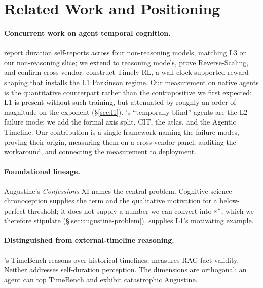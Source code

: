 
\section{Related Work and Positioning}
\label{sec:related-work}

\paragraph{Concurrent work on agent temporal cognition.}
\citet{garikaparthi2026canllmstime} report duration self-reports across four non-reasoning models, matching L3 on our non-reasoning slice; we extend to reasoning models, prove Reverse-Scaling, and confirm cross-vendor. \citet{ma2026timelymachine} construct Timely-RL, a wall-clock-supported reward shaping that installs the L1 Parkinson regime. Our measurement on native agents is the quantitative counterpart rather than the contrapositive we first expected: L1 is present without such training, but attenuated by roughly an order of magnitude on the exponent (\S\ref{sec:l1}). \citet{cheng2025temporallyblind}'s ``temporally blind'' agents are the L2 failure mode; we add the formal axis split, CIT, the atlas, and the Agentic Timeline. Our contribution is a single framework naming the failure modes, proving their origin, measuring them on a cross-vendor panel, auditing the workaround, and connecting the measurement to deployment.

\paragraph{Foundational lineage.}
Augustine's \emph{Confessions} XI \citep{augustine_confessions} names the central problem. Cognitive-science chronoception \citep{wittmann2009chronoception,eagleman2008time} supplies the term and the qualitative motivation for a below-perfect threshold; it does not supply a number we can convert into $\varepsilon^{*}$, which we therefore stipulate (\S\ref{sec:augustine-problem}). \citet{parkinson1955} supplies L1's motivating example.

\paragraph{Distinguished from external-timeline reasoning.}
\citet{chu2024timebench}'s TimeBench reasons over historical timelines; \citet{goel2025chronocept} measures RAG fact validity. Neither addresses self-duration perception. The dimensions are orthogonal: an agent can top TimeBench and exhibit catastrophic Augustine.

